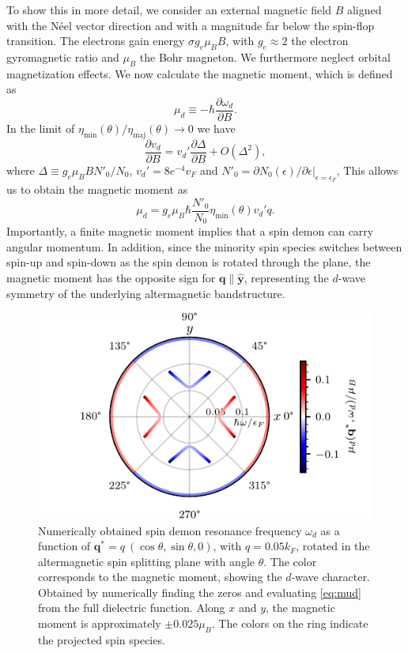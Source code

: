 \documentclass[aps,prl,reprint,twocolumns,superscriptaddress]{revtex4-2}
\newcommand{\deltaq}{\eta_{{\mathrm{min}}}(\theta)/\eta_{{\mathrm{maj}}}(\theta)}
\newcommand{\kF}{k_{F}}
\newcommand{\vs}{v_d}
\newcommand{\muB}{0.025}
\begin{document}
	To show this in more detail,  we consider an external magnetic field $B$ aligned with the N\'{e}el vector direction and with a magnitude far below the spin-flop transition. The electrons  gain energy $\sigma g_e\mu_B B$, with $g_e\approx2$ the electron gyromagnetic ratio and $\mu_B$ the Bohr magneton. We furthermore neglect orbital magnetization effects. We now calculate the magnetic moment, which is defined as
	\begin{equation}
		\mu_d \equiv -\hbar\frac{\partial\omega_d}{\partial B}. \label{eq:mud}
	\end{equation}
	In the limit of $\deltaq\rightarrow0$ we have
	\begin{equation}
		\frac{\partial \vs}{\partial B} = \vs' \frac{\partial\Delta}{\partial B} + O(\Delta^2),
	\end{equation}
	where $\Delta\equiv g_e\mu_B B N'_0 /N_0 $, $ \vs'=8e^{-4}v_F$ and $N'_0=\partial N_0(\epsilon)/\partial\epsilon|_{\epsilon=\epsilon_F}$, 
	This allows us to obtain the magnetic moment as
	\begin{equation}
		\mu_d =  g_e\mu_B\hbar \frac{N'_0}{N_0}  \eta_{\mathrm{min}}(\theta)  \vs' q. \label{eq:mup}
	\end{equation}
	Importantly, a finite magnetic moment implies that a spin demon can carry angular momentum. 
	In addition, since the minority spin species switches between spin-up and spin-down as the spin demon is rotated through the plane, the magnetic moment has the opposite sign for $\bm q \parallel \hat{\bm y}$, representing the $d$-wave symmetry of the underlying altermagnetic bandstructure. 
	
	\begin{figure}
		\centering
		\includegraphics[width=0.8\columnwidth]{polar-plot-sign}
		\caption{Numerically obtained spin demon resonance frequency $\omega_d$ as a function of $\bm q^*=q\ (\cos\theta, \sin\theta,0)$, with $q=0.05\kF$, rotated in the altermagnetic spin splitting plane with angle $\theta$. The color corresponds to the magnetic moment, showing the $d$-wave character. Obtained by numerically finding the zeros and evaluating \cref{eq:mud} from the full dielectric function.
			Along $x$ and $y$, the magnetic moment is approximately $\pm\muB\mu_B$. The colors on the ring indicate the projected spin species. \label{fig:magnetic-moment} }
	\end{figure}
	
\end{document}
